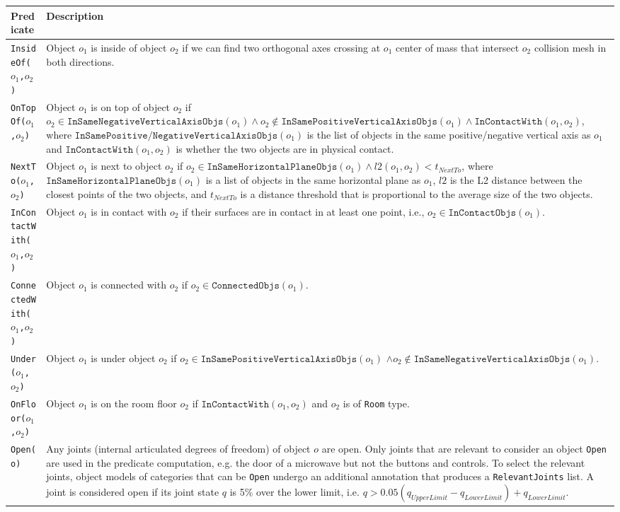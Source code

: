 \begin{table}[!htbp]
\begin{center}
{\scriptsize%
\renewcommand{\arraystretch}{1.2}
\begin{tabular}{ | m{} | m{} | } 
\hline
\textbf{Predicate} & \textbf{Description} \\ 
\hline
\texttt{InsideOf($o_1$,$o_2$)} & Object $o_1$ is inside of object $o_2$ if we can find two orthogonal axes crossing at $o_1$ center of mass that intersect $o_2$ collision mesh in both directions.\\ 
\hline
\texttt{OnTopOf($o_1$,$o_2$)} & Object $o_1$ is on top of object $o_2$ if $o_2 \in \texttt{InSameNegativeVerticalAxisObjs}(o_1) \land o_2 \not\in \texttt{InSamePositiveVerticalAxisObjs}(o_1) \land \texttt{InContactWith}(o_1, o_2)$, where $\texttt{InSamePositive/NegativeVerticalAxisObjs}(o_1)$ is the list of objects in the same positive/negative vertical axis as $o_1$ and $\texttt{InContactWith}(o_1, o_2)$ is whether the two objects are in physical contact.\\ 
\hline
\texttt{NextTo($o_1$,$o_2$)} & Object $o_1$ is next to object $o_2$ if $o_2 \in \texttt{InSameHorizontalPlaneObjs}(o_1) \land l2(o_1, o_2) < t_\mathit{NextTo}$, where $\texttt{InSameHorizontalPlaneObjs}(o_1)$ is a list of objects in the same horizontal plane as $o_1$, $l2$ is the L2 distance between the closest points of the two objects, and $t_\mathit{NextTo}$ is a distance threshold that is proportional to the average size of the two objects. \\
\hline
\texttt{InContactWith($o_1$,$o_2$)} & Object $o_1$ is in contact with $o_2$ if their surfaces are in contact in at least one point, i.e., $o_2 \in \texttt{InContactObjs}(o_1)$. \\ 
\hline
\texttt{ConnectedWith($o_1$,$o_2$)} & Object $o_1$ is connected with $o_2$ if $o_2 \in \texttt{ConnectedObjs}(o_1)$. \\ 
\hline
\texttt{Under($o_1$,$o_2$)} & Object $o_1$ is under object $o_2$ if $o_2 \in \texttt{InSamePositiveVerticalAxisObjs}(o_1)$ $\land o_2 \not\in \texttt{InSameNegativeVerticalAxisObjs}(o_1)$.\\
\hline
\texttt{OnFloor($o_1$,$o_2$)} & Object $o_1$ is on the room floor $o_2$ if $\texttt{InContactWith}(o_1, o_2)$ and $o_2$ is of \texttt{Room} type. \\ 
\hline
\texttt{Open(o)} & Any joints (internal articulated degrees of freedom) of object $o$ are open. Only joints that are relevant to consider an object \texttt{Open} are used in the predicate computation, e.g. the door of a microwave but not the buttons and controls. To select the relevant joints, object models of categories that can be \texttt{Open} undergo an additional annotation that produces a \texttt{RelevantJoints} list. A joint is considered open if its joint state $q$ is 5\% over the lower limit, i.e. $q > 0.05(q_\mathit{UpperLimit} - q_\mathit{LowerLimit}) + q_\mathit{LowerLimit}$. \\

\end{tabular}}
\end{center}
\end{table}
